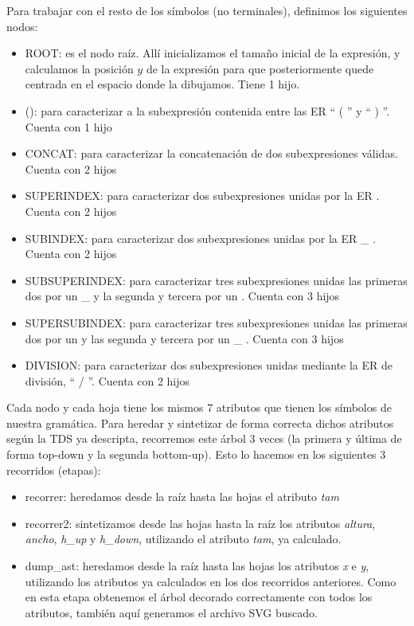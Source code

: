 \documentclass[a4paper, 10pt, twoside]{article}
\begin{document}
Para trabajar con el resto de los símbolos (no terminales), definimos los siguientes nodos:
\begin{itemize}
  \item ROOT: es el nodo raíz. Allí inicializamos el tamaño inicial de la expresión, y calculamos la posición $y$ de la expresión para que posteriormente quede centrada en el espacio donde la dibujamos. Tiene 1 hijo.
  \item (): para caracterizar a la subexpresión contenida entre las ER `` ( '' y `` ) ''. Cuenta con 1 hijo
  \item CONCAT: para caracterizar la concatenación de dos subexpresiones válidas. Cuenta con 2 hijos
  \item SUPERINDEX: para caracterizar dos subexpresiones unidas por la ER \detokenize{^}. Cuenta con 2 hijos
  \item SUBINDEX: para caracterizar dos subexpresiones unidas por la ER \_ . Cuenta con 2 hijos
  \item SUBSUPERINDEX: para caracterizar tres subexpresiones unidas las primeras dos por un \_ y la segunda y tercera por un \detokenize{^}. Cuenta con 3 hijos
  \item SUPERSUBINDEX: para caracterizar tres subexpresiones unidas las primeras dos por un \detokenize{^} y las segunda y tercera por un \_ . Cuenta con 3 hijos
  \item DIVISION: para caracterizar dos subexpresiones unidas mediante la ER de división, `` / ''. Cuenta con 2 hijos
\end{itemize}

Cada nodo y cada hoja tiene los mismos 7 atributos que tienen los símbolos de nuestra gramática. Para heredar y sintetizar de forma correcta dichos atributos según la TDS ya descripta, recorremos este árbol 3 veces (la primera y última de forma top-down y la segunda bottom-up). Esto lo hacemos en los siguientes 3 recorridos (etapas):
\begin{itemize}
  \item recorrer: heredamos desde la raíz hasta las hojas el atributo \emph{tam}
  \item recorrer2: sintetizamos desde las hojas hasta la raíz los atributos \emph{altura}, \emph{ancho}, \emph{h\_up} y \emph{h\_down}, utilizando el atributo \emph{tam}, ya calculado.
  \item dump_ast: heredamos desde la raíz hasta las hojas los atributos \emph{x} e \emph{y}, utilizando los atributos ya calculados en los dos recorridos anteriores. Como en esta etapa obtenemos el árbol decorado correctamente con todos los atributos, también aquí generamos el archivo SVG buscado.
\end{itemize}
\end{document}
